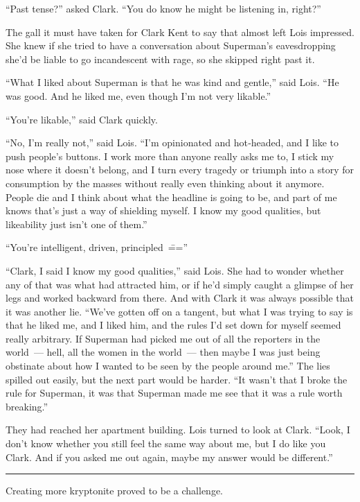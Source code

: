 \documentclass[ebook,12pt]{memoir}
\begin{document}
``Past tense?'' asked Clark. ``You do know he might be listening in,
right?''

The gall it must have taken for Clark Kent to say that almost left Lois
impressed. She knew if she tried to have a conversation about Superman's
eavesdropping she'd be liable to go incandescent with rage, so she
skipped right past it.

``What I liked about Superman is that he was kind and gentle,'' said
Lois. ``He was good. And he liked me, even though I'm not very
likable.''

``You're likable,'' said Clark quickly.

``No, I'm really not,'' said Lois. ``I'm opinionated and hot‐headed, and
I like to push people's buttons. I work more than anyone really asks me
to, I stick my nose where it doesn't belong, and I turn every tragedy or
triumph into a story for consumption by the masses without really even
thinking about it anymore. People die and I think about what the
headline is going to be, and part of me knows that's just a way of
shielding myself. I know my good qualities, but likeability just isn't
one of them.''

``You're intelligent, driven, principled~\===''

``Clark, I said I know my good qualities,'' said Lois. She had to wonder
whether any of that was what had attracted him, or if he'd simply caught
a glimpse of her legs and worked backward from there. And with Clark it
was always possible that it was another lie. ``We've gotten off on a
tangent, but what I was trying to say is that he liked me, and I liked
him, and the rules I'd set down for myself seemed really arbitrary. If
Superman had picked me out of all the reporters in the world~--- hell,
all the women in the world~--- then maybe I was just being obstinate
about how I wanted to be seen by the people around me.'' The lies
spilled out easily, but the next part would be harder. ``It wasn't that
I broke the rule for Superman, it was that Superman made me see that it
was a rule worth breaking.''

They had reached her apartment building. Lois turned to look at Clark.
``Look, I don't know whether you still feel the same way about me, but I
do like you Clark. And if you asked me out again, maybe my answer would
be different.''

\begin{center}\rule{0.5\linewidth}{0.5pt}\end{center}

Creating more kryptonite proved to be a challenge.
\end{document}
